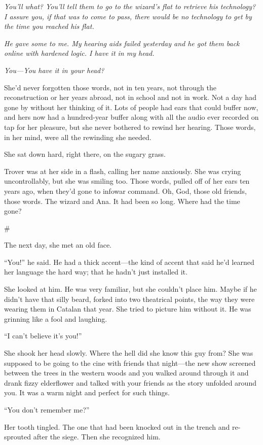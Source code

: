 \emph{You’ll what? You’ll tell them to go to the wizard’s flat to retrieve his technology? I assure you, if that was to come to pass, there would be no technology to get by the time you reached his flat.}

\emph{He gave some to me. My hearing aids failed yesterday and he got them back online with hardened logic. I have it in my head.}

\emph{You—You have it in your head?}

She’d never forgotten those words, not in ten years, not through
the reconstruction or her years abroad, not in school and not in
work. Not a day had gone by without her thinking of it. Lots of
people had ears that could buffer now, and hers now had a
hundred-year buffer along with all the audio ever recorded on tap
for her pleasure, but she never bothered to rewind her hearing.
Those words, in her mind, were all the rewinding she needed.

She sat down hard, right there, on the sugary grass.

Trover was at her side in a flash, calling her name anxiously. She
was crying uncontrollably, but she was smiling too. Those words,
pulled off of her ears ten years ago, when they’d gone to infowar
command. Oh, God, those old friends, those words. The wizard and
Ana. It had been so long. Where had the time gone?

\#

The next day, she met an old face.

“You!” he said. He had a thick accent—the kind of accent that said
he’d learned her language the hard way; that he hadn’t just
installed it.

She looked at him. He was very familiar, but she couldn’t place
him. Maybe if he didn’t have that silly beard, forked into two
theatrical points, the way they were wearing them in Catalan that
year. She tried to picture him without it. He was grinning like a
fool and laughing.

“I can’t believe it’s you!”

She shook her head slowly. Where the hell did she know this guy
from? She was supposed to be going to the cine with friends that
night—the new show screened between the trees in the western woods
and you walked around through it and drank fizzy elderflower and
talked with your friends as the story unfolded around you. It was a
warm night and perfect for such things.

“You don’t remember me?”

Her tooth tingled. The one that had been knocked out in the trench
and re-sprouted after the siege. Then she recognized him.

